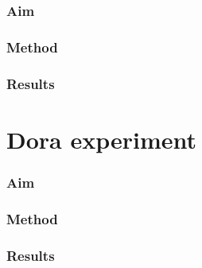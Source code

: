 \subsubsection{Aim}
\subsubsection{Method}
\subsubsection{Results}

\section{Dora experiment}
\subsubsection{Aim}
\subsubsection{Method}
\subsubsection{Results}

